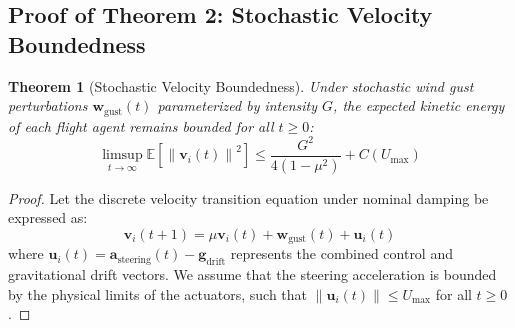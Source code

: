 \documentclass[letterpaper, 10pt, conference]{IEEEtran}
\newtheorem{theorem}{Theorem}
\newcommand{\norm}[1]{\left\lVert#1\right\rVert}
\begin{document}
\subsection{Proof of Theorem 2: Stochastic Velocity Boundedness}
\begin{theorem}[Stochastic Velocity Boundedness]
Under stochastic wind gust perturbations $\mathbf{w}_{\text{gust}}(t)$ parameterized by intensity $G$, the expected kinetic energy of each flight agent remains bounded for all $t \geq 0$:
\begin{equation}
    \limsup_{t \to \infty} \mathbb{E}\left[\norm{\mathbf{v}_i(t)}^2\right] \leq \frac{G^2}{4(1 - \mu^2)} + C(U_{\max})
\end{equation}
\end{theorem}

\begin{proof}
Let the discrete velocity transition equation under nominal damping be expressed as:
\begin{equation}
    \mathbf{v}_i(t+1) = \mu \mathbf{v}_i(t) + \mathbf{w}_{\text{gust}}(t) + \mathbf{u}_i(t)
\end{equation}
where $\mathbf{u}_i(t) = \mathbf{a}_{\text{steering}}(t) - \mathbf{g}_{\text{drift}}$ represents the combined control and gravitational drift vectors. We assume that the steering acceleration is bounded by the physical limits of the actuators, such that $\norm{\mathbf{u}_i(t)} \leq U_{\max}$ for all $t \geq 0$.


\end{proof}
\end{document}

